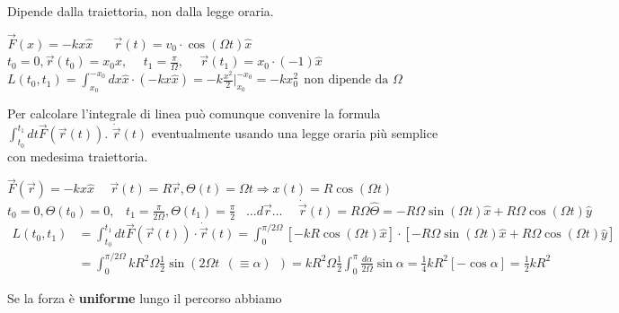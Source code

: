 Dipende dalla traiettoria, non dalla legge oraria.
\begin{example}
    $\vec{F}(x)= -kx\hat{x} \hspace{20pt} \vec{r}(t) = v_0 \cdot \cos(\Omega t)\hat{x}$\\
    $t_0 = 0, \vec{r}(t_0) = x_0 \hat{x}, \hspace{15pt} t_1 = \frac{\pi}{\Omega}, \hspace{15pt} \vec{r}(t_1) = x_0 \cdot (-1)\hat{x}$\\
    $L(t_0, t_1) = \int_{x_0}^{-x_0}dx \hat{x} \cdot (-kx\hat{x}) = -k \frac{x^2}{2} |_{x_0}^{-x_0} = -k x_0^2 \:\: \text{non dipende da }\Omega$
\end{example}
\begin{observation}
    Per calcolare l'integrale di linea può comunque convenire la formula $\int_{t_0}^{t_1}dt \vec{F}(\vec{r}(t))$. 
    $\dot{\vec{r}}(t)$ eventualmente usando una legge oraria più semplice con medesima traiettoria.
\end{observation}
\begin{example}
    $\vec{F}(\vec{r}) = -kx\hat{x} \hspace{15pt}\vec{r}(t) = R\vec{r}, \Theta(t) = \Omega t \Rightarrow x(t) = R \cos(\Omega t)$\\
    $t_0 = 0, \Theta(t_0) = 0, \hspace{10pt}t_1 = \frac{\pi}{2\Omega}, \Theta(t_1) = \frac{\pi}{2} \hspace{10pt} \dots d\vec{r}\dots \hspace{15pt} \dot{\vec{r}}(t) = R\Omega\hat{\Theta} = -R\Omega\sin(\Omega t)\hat{x} + R\Omega \cos(\Omega t)\hat{y}$
    \begin{equation*}
        \begin{split}
            L(t_0, t_1) & = \int_{t_0}^{t_1}dt \vec{F}(\vec{r}(t)) \cdot \dot{\vec{r}}(t) = \int_{0}^{\pi/2\Omega}[-k R \cos(\Omega t)\hat{x}] \cdot [-R \Omega \sin(\Omega t) \hat{x} + R\Omega \cos(\Omega t)\hat{y}]\\
                        & = \int_{0}^{\pi/2\Omega}kR^2 \Omega \frac{1}{2}\sin(2\Omega t \:\: (\equiv \alpha) \:\:) = kR^2 \Omega \frac{1}{2}\int_{0}^{\pi} \frac{d\alpha}{2\Omega}\sin\alpha = \frac{1}{4} kR^2[-\cos\alpha] = \frac{1}{2}kR^2 
        \end{split}
    \end{equation*}
\end{example}
\hspace{-15pt}Se la forza è \textbf{uniforme} lungo il percorso abbiamo
